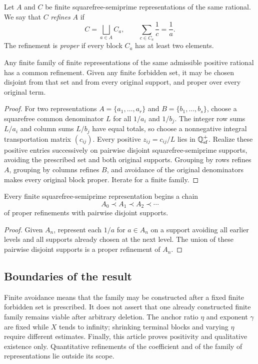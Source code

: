 \begin{definition}
Let $A$ and $C$ be finite squarefree-semiprime representations of the same rational. We say that $C$ \emph{refines} $A$ if
\[
 C=\bigsqcup_{a\in A}C_a,
 \qquad
 \sum_{c\in C_a}\frac1c=\frac1a.
\]
The refinement is \emph{proper} if every block $C_a$ has at least two elements.
\end{definition}

\begin{theorem}
\label{thm:common-refinement}
Any finite family of finite representations of the same admissible positive rational has a common refinement. Given any finite forbidden set, it may be chosen disjoint from that set and from every original support, and proper over every original term.
\end{theorem}
\begin{proof}
For two representations $A=\{a_1,\ldots,a_r\}$ and $B=\{b_1,\ldots,b_s\}$, choose a squarefree common denominator $L$ for all $1/a_i$ and $1/b_j$. The integer row sums $L/a_i$ and column sums $L/b_j$ have equal totals, so choose a nonnegative integral transportation matrix $(c_{ij})$. Every positive $z_{ij}=c_{ij}/L$ lies in $\mathbb Q_{\rm sf}^+$. Realize these positive entries successively on pairwise disjoint squarefree-semiprime supports, avoiding the prescribed set and both original supports. Grouping by rows refines $A$, grouping by columns refines $B$, and avoidance of the original denominators makes every original block proper. Iterate for a finite family.
\end{proof}

\begin{corollary}
\label{cor:infinite-refinement-chain}
Every finite squarefree-semiprime representation begins a chain
\[
 A_0\prec A_1\prec A_2\prec\cdots
\]
of proper refinements with pairwise disjoint supports.
\end{corollary}
\begin{proof}
Given $A_n$, represent each $1/a$ for $a\in A_n$ on a support avoiding all earlier levels and all supports already chosen at the next level. The union of these pairwise disjoint supports is a proper refinement of $A_n$.
\end{proof}

\subsection{Boundaries of the result}

Finite avoidance means that the family may be constructed after a fixed finite forbidden set is prescribed. It does not assert that one already constructed finite family remains viable after arbitrary deletion. The anchor ratio $\eta$ and exponent $\gamma$ are fixed while $X$ tends to infinity; shrinking terminal blocks and varying $\eta$ require different estimates. Finally, this article proves positivity and qualitative existence only. Quantitative refinements of the coefficient and of the family of representations lie outside its scope.

